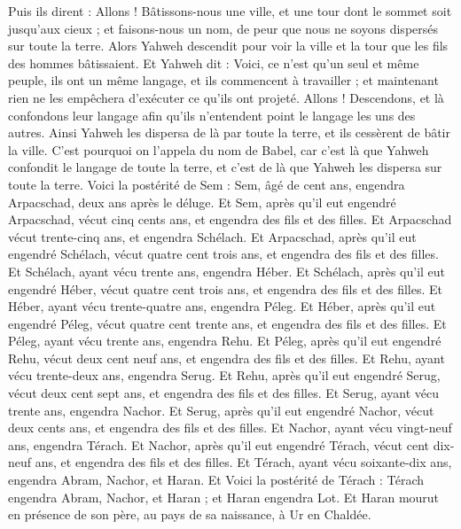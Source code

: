 \begin{multicols}{2}
Puis ils dirent : Allons ! Bâtissons-nous une ville, et une tour dont le sommet soit jusqu'aux cieux ; et faisons-nous un nom, de peur que nous ne soyons dispersés sur toute la terre.
Alors Yahweh descendit pour voir la ville et la tour que les fils des hommes bâtissaient.
Et Yahweh dit : Voici, ce n'est qu'un seul et même peuple, ils ont un même langage, et ils commencent à travailler ; et maintenant rien ne les empêchera d'exécuter ce qu'ils ont projeté.
Allons ! Descendons, et là confondons leur langage afin qu'ils n'entendent point le langage les uns des autres.
Ainsi Yahweh les dispersa de là par toute la terre, et ils cessèrent de bâtir la ville.
C'est pourquoi on l'appela du nom de Babel, car c'est là que Yahweh confondit le langage de toute la terre, et c'est de là que Yahweh les dispersa sur toute la terre.
Voici la postérité de Sem : Sem, âgé de cent ans, engendra Arpacschad, deux ans après le déluge.
Et Sem, après qu'il eut engendré Arpacschad, vécut cinq cents ans, et engendra des fils et des filles.
Et Arpacschad vécut trente-cinq ans, et engendra Schélach.
Et Arpacschad, après qu'il eut engendré Schélach, vécut quatre cent trois ans, et engendra des fils et des filles.
Et Schélach, ayant vécu trente ans, engendra Héber.
Et Schélach, après qu'il eut engendré Héber, vécut quatre cent trois ans, et engendra des fils et des filles.
Et Héber, ayant vécu trente-quatre ans, engendra Péleg.
Et Héber, après qu'il eut engendré Péleg, vécut quatre cent trente ans, et engendra des fils et des filles.
Et Péleg, ayant vécu trente ans, engendra Rehu.
Et Péleg, après qu'il eut engendré Rehu, vécut deux cent neuf ans, et engendra des fils et des filles.
Et Rehu, ayant vécu trente-deux ans, engendra Serug.
Et Rehu, après qu'il eut engendré Serug, vécut deux cent sept ans, et engendra des fils et des filles.
Et Serug, ayant vécu trente ans, engendra Nachor.
Et Serug, après qu'il eut engendré Nachor, vécut deux cents ans, et engendra des fils et des filles.
Et Nachor, ayant vécu vingt-neuf ans, engendra Térach.
Et Nachor, après qu'il eut engendré Térach, vécut cent dix-neuf ans, et engendra des fils et des filles.
Et Térach, ayant vécu soixante-dix ans, engendra Abram, Nachor, et Haran.
Et Voici la postérité de Térach : Térach engendra Abram, Nachor, et Haran ; et Haran engendra Lot.
Et Haran mourut en présence de son père, au pays de sa naissance, à Ur en Chaldée.

\end{multicols}
